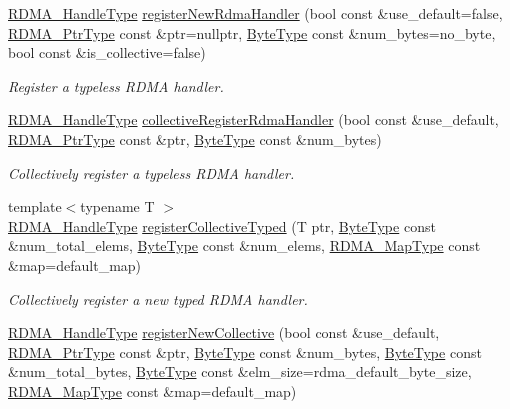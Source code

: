 \begin{DoxyCompactItemize}
\hyperlink{namespacevt_a10442579ec4e7ebef223818e64bcf908}{R\+D\+M\+A\+\_\+\+Handle\+Type} \hyperlink{structvt_1_1rdma_1_1_r_d_m_a_manager_ab68308f4b3b72714f81a00755736b0b5}{register\+New\+Rdma\+Handler} (bool const \&use\+\_\+default=false, \hyperlink{namespacevt_aab05b4a584f7ee835a6d0f66915cf59b}{R\+D\+M\+A\+\_\+\+Ptr\+Type} const \&ptr=nullptr, \hyperlink{namespacevt_aab8d55968084610ce3b17057981e9300}{Byte\+Type} const \&num\+\_\+bytes=no\+\_\+byte, bool const \&is\+\_\+collective=false)
\begin{DoxyCompactList}\small\item\em Register a typeless R\+D\+MA handler. \end{DoxyCompactList}\item 
\hyperlink{namespacevt_a10442579ec4e7ebef223818e64bcf908}{R\+D\+M\+A\+\_\+\+Handle\+Type} \hyperlink{structvt_1_1rdma_1_1_r_d_m_a_manager_a526b7c441125a9d5ed9528736be97819}{collective\+Register\+Rdma\+Handler} (bool const \&use\+\_\+default, \hyperlink{namespacevt_aab05b4a584f7ee835a6d0f66915cf59b}{R\+D\+M\+A\+\_\+\+Ptr\+Type} const \&ptr, \hyperlink{namespacevt_aab8d55968084610ce3b17057981e9300}{Byte\+Type} const \&num\+\_\+bytes)
\begin{DoxyCompactList}\small\item\em Collectively register a typeless R\+D\+MA handler. \end{DoxyCompactList}\item 
{\footnotesize template$<$typename T $>$ }\\\hyperlink{namespacevt_a10442579ec4e7ebef223818e64bcf908}{R\+D\+M\+A\+\_\+\+Handle\+Type} \hyperlink{structvt_1_1rdma_1_1_r_d_m_a_manager_ad851bdc250182163eb4996888ba1b863}{register\+Collective\+Typed} (T ptr, \hyperlink{namespacevt_aab8d55968084610ce3b17057981e9300}{Byte\+Type} const \&num\+\_\+total\+\_\+elems, \hyperlink{namespacevt_aab8d55968084610ce3b17057981e9300}{Byte\+Type} const \&num\+\_\+elems, \hyperlink{structvt_1_1rdma_1_1_r_d_m_a_manager_a16e12d11cf7d771df0d3dc6947a4f95c}{R\+D\+M\+A\+\_\+\+Map\+Type} const \&map=default\+\_\+map)
\begin{DoxyCompactList}\small\item\em Collectively register a new typed R\+D\+MA handler. \end{DoxyCompactList}\item 
\hyperlink{namespacevt_a10442579ec4e7ebef223818e64bcf908}{R\+D\+M\+A\+\_\+\+Handle\+Type} \hyperlink{structvt_1_1rdma_1_1_r_d_m_a_manager_a339763a690f218c3df58268a691ecfe4}{register\+New\+Collective} (bool const \&use\+\_\+default, \hyperlink{namespacevt_aab05b4a584f7ee835a6d0f66915cf59b}{R\+D\+M\+A\+\_\+\+Ptr\+Type} const \&ptr, \hyperlink{namespacevt_aab8d55968084610ce3b17057981e9300}{Byte\+Type} const \&num\+\_\+bytes, \hyperlink{namespacevt_aab8d55968084610ce3b17057981e9300}{Byte\+Type} const \&num\+\_\+total\+\_\+bytes, \hyperlink{namespacevt_aab8d55968084610ce3b17057981e9300}{Byte\+Type} const \&elm\+\_\+size=rdma\+\_\+default\+\_\+byte\+\_\+size, \hyperlink{structvt_1_1rdma_1_1_r_d_m_a_manager_a16e12d11cf7d771df0d3dc6947a4f95c}{R\+D\+M\+A\+\_\+\+Map\+Type} const \&map=default\+\_\+map)

\end{DoxyCompactItemize}
